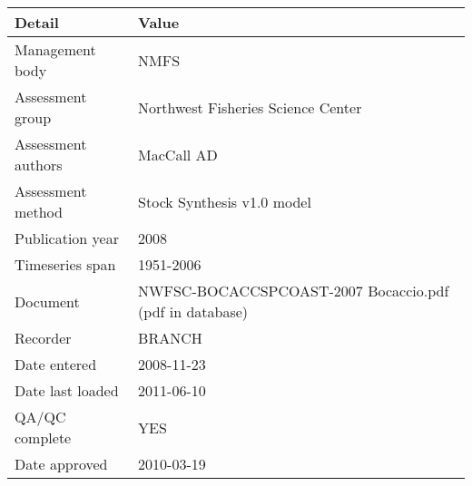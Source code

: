 \begin{table}[htb]
\centering
\begin{tabular}{lp{7cm}}
\toprule
Detail & Value \\
\midrule
Management body    & NMFS                                                    \\
Assessment group   & Northwest Fisheries Science Center                      \\
Assessment authors & MacCall AD                                              \\
Assessment method  & Stock Synthesis v1.0 model                              \\
Publication year   & 2008                                                    \\
Timeseries span    & 1951-2006                                               \\
Document           & NWFSC-BOCACCSPCOAST-2007 Bocaccio.pdf (pdf in database) \\
Recorder           & BRANCH                                                  \\
Date entered       & 2008-11-23                                              \\
Date last loaded   & 2011-06-10                                              \\
QA/QC complete     & YES                                                     \\
Date approved      & 2010-03-19                                              \\
\bottomrule
\end{tabular}
\label{tab:assessdet}
\end{table}
